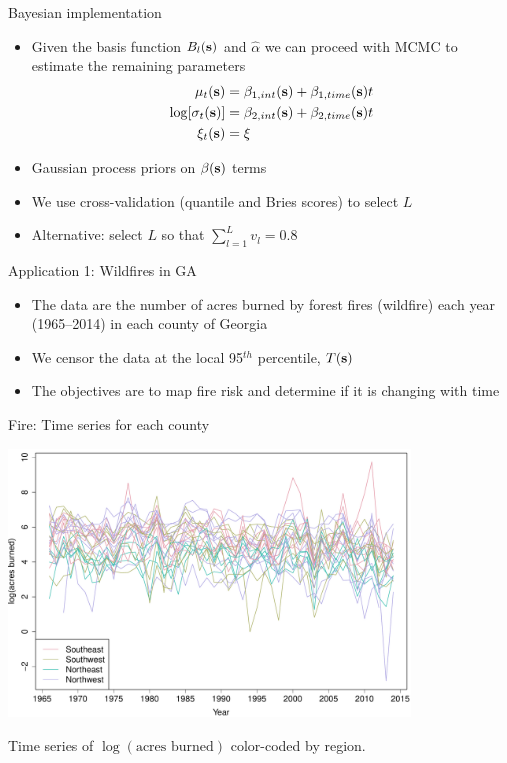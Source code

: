 \documentclass{beamer}
\begin{document}
\begin{frame}{Bayesian implementation}
	\begin{itemize}\setlength{\itemsep}{1em}
		\item Given the basis function $B_l(\mathbf{s})$ and $\hat{\alpha}$ we can proceed with MCMC to estimate the remaining parameters
		\begin{align*}
		  \mu_t(\mathbf{s}) &= \beta_{1,int}(\mathbf{s}) + \beta_{1,time}(\mathbf{s})t\\
		  \log[\sigma_t(\mathbf{s})] &= \beta_{2,int}(\mathbf{s}) + \beta_{2,time}(\mathbf{s})t\\
		  \xi_t(\mathbf{s}) &= \xi
		\end{align*}
		\item Gaussian process priors on $\beta(\mathbf{s})$ terms
		\item We use cross-validation (quantile and Bries scores) to select $L$
		\item Alternative: select $L$ so that $\sum_{l=1}^Lv_l = 0.8$
	\end{itemize}
\end{frame}


\begin{frame}{Application 1: Wildfires in GA}
	\begin{itemize}\setlength{\itemsep}{1em}
		\item The data are the number of acres burned by forest fires (wildfire) each year (1965--2014) in each county of Georgia
		\item We censor the data at the local 95$^{th}$ percentile, $T(\mathbf{s})$
		\item The objectives are to map fire risk and determine if it is changing with time
	\end{itemize}
\end{frame}


\begin{frame}{Fire: Time series for each county }
	\begin{center}
		\includegraphics[width=0.8\textwidth]{fire-spag-rand-25}

    Time series of $\log(\text{acres burned})$ color-coded by region.
	\end{center}
\end{frame}
\end{document}

